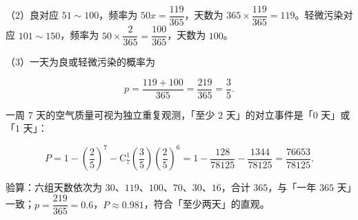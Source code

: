 \begin{answer}
（2）良对应 $51\sim100$，频率为 $50x=\dfrac{119}{365}$，天数为 $365\times\dfrac{119}{365}=119$。轻微污染对应 $101\sim150$，频率为 $50\times\dfrac{2}{365}=\dfrac{100}{365}$，天数为 $100$。

（3）一天为良或轻微污染的概率为

\nopagebreak[4]
\[p=\frac{119+100}{365}=\frac{219}{365}=\frac35.\]

一周 $7$ 天的空气质量可视为独立重复观测，「至少 $2$ 天」的对立事件是「$0$ 天」或「$1$ 天」：

\nopagebreak[4]
\[P=1-\left(\frac25\right)^7-\mathrm C_7^1\left(\frac35\right)\left(\frac25\right)^6=1-\frac{128}{78125}-\frac{1344}{78125}=\frac{76653}{78125}.\]

验算：六组天数依次为 $30$、$119$、$100$、$70$、$30$、$16$，合计 $365$，与「一年 $365$ 天」一致；$p=\dfrac{219}{365}=0.6$，$P\approx0.981$，符合「至少两天」的直观。


\end{answer}

